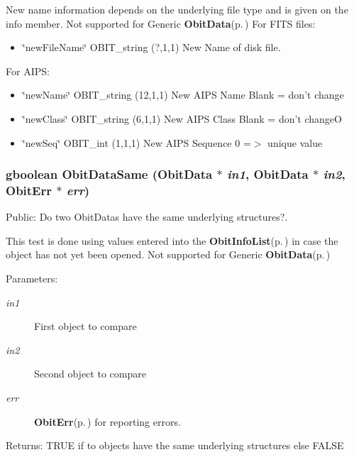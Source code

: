 New name information depends on the underlying file type and is given on the info member. Not supported for Generic {\bf Obit\-Data}{\rm (p.\,\pageref{structObitData})} For FITS files: \begin{itemize}
\item \char`\"{}new\-File\-Name\char`\"{} OBIT\_\-string (?,1,1) New Name of disk file.\end{itemize}
For AIPS: \begin{itemize}
\item \char`\"{}new\-Name\char`\"{} OBIT\_\-string (12,1,1) New AIPS Name Blank = don't change \item \char`\"{}new\-Class\char`\"{} OBIT\_\-string (6,1,1) New AIPS Class Blank = don't change\-O \item \char`\"{}new\-Seq\char`\"{} OBIT\_\-int (1,1,1) New AIPS Sequence 0 =$>$ unique value 
\end{itemize}
\subsubsection{\setlength{\rightskip}{0pt plus 5cm}gboolean Obit\-Data\-Same ({\bf Obit\-Data} $\ast$ {\em in1}, {\bf Obit\-Data} $\ast$ {\em in2}, {\bf Obit\-Err} $\ast$ {\em err})}\label{ObitData_8h_a36}


Public: Do two Obit\-Datas have the same underlying structures?. 

This test is done using values entered into the {\bf Obit\-Info\-List}{\rm (p.\,\pageref{structObitInfoList})} in case the object has not yet been opened. Not supported for Generic {\bf Obit\-Data}{\rm (p.\,\pageref{structObitData})} \begin{Desc}
\item[Parameters:]
\begin{description}
\item[{\em in1}]First object to compare \item[{\em in2}]Second object to compare \item[{\em err}]{\bf Obit\-Err}{\rm (p.\,\pageref{structObitErr})} for reporting errors. \end{description}
\end{Desc}
\begin{Desc}
\item[Returns:]TRUE if to objects have the same underlying structures else FALSE \end{Desc}
